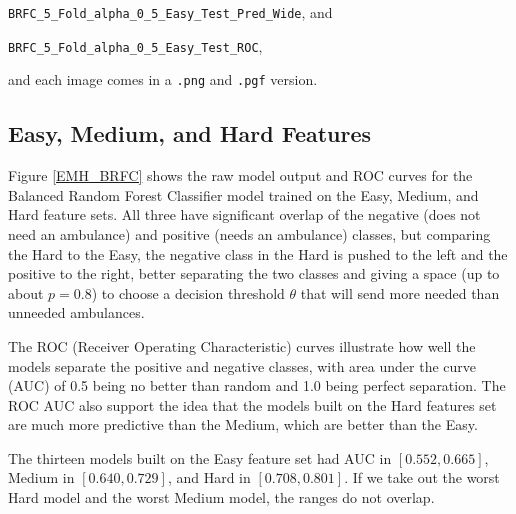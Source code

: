 \verb|BRFC_5_Fold_alpha_0_5_Easy_Test_Pred_Wide|, and

\verb|BRFC_5_Fold_alpha_0_5_Easy_Test_ROC|, 

\noindent and each image comes in a \verb|.png| and \verb|.pgf| version.


\subsection{Easy, Medium, and Hard Features}
\label{results_EMH}

Figure \ref{EMH_BRFC} shows the raw model output and ROC curves for the Balanced Random Forest Classifier model trained on the Easy, Medium, and Hard feature sets.  All three have significant overlap of the negative (does not need an ambulance) and positive (needs an ambulance) classes, but comparing the Hard to the Easy, the negative class in the Hard is pushed to the left and the positive to the right, better separating the two classes and giving a space (up to about $p=0.8$) to choose a decision threshold $\theta$ that will send more needed than unneeded ambulances.  

The ROC (Receiver Operating Characteristic) curves illustrate how well the models separate the positive and negative classes, with area under the curve (AUC) of 0.5 being no better than random and 1.0 being perfect separation.  The ROC AUC also support the idea that the models built on the Hard features set are much more predictive than the Medium, which are better than the Easy.

The thirteen models built on the Easy feature set had AUC in $[0.552,0.665]$, Medium in $[0.640,0.729]$, 
and Hard in $[0.708,0.801]$.  If we take out the worst Hard model and the worst Medium model, the ranges do not overlap.  

